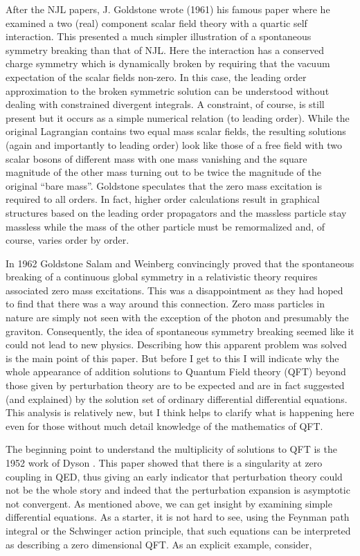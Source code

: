 \documentclass[letterpaper,twoside,preprintnumbers,slac_one]{revtex4}
\begin{document}
After the NJL papers, J. Goldstone wrote (1961) \cite{jg;1961} his
famous paper where he examined a two (real) component scalar field
theory with a quartic self interaction. This presented a much simpler
illustration of a spontaneous symmetry breaking than that of NJL.
Here the interaction has a conserved charge symmetry which is
dynamically broken by requiring that the vacuum expectation of the
scalar fields non-zero. In this case, the leading
order approximation to the broken symmetric solution can be understood
without dealing with constrained divergent integrals. A constraint, of
course, is still present but it occurs as a simple numerical relation
(to leading order). While the original Lagrangian contains two equal
mass scalar fields, the resulting solutions (again and importantly to
leading order) look like those of a free field with two scalar bosons
of different mass with one mass vanishing and the square magnitude of
the other mass turning out to be twice the magnitude of the original
``bare mass''. Goldstone speculates that the zero mass excitation is required to all orders.
In fact,  higher order calculations result in graphical
structures based on the leading order propagators and the massless
particle stay massless while the mass of the other particle must be
remormalized and, of course, varies order by order.

In 1962 Goldstone Salam and Weinberg \cite{gsw;1962} convincingly proved that the
spontaneous breaking of a continuous global symmetry in a relativistic
theory requires associated zero mass excitations. This was a disappointment as they had hoped to
find that there was a way around this connection. Zero mass particles in nature are simply not seen with the
exception of the photon and presumably the graviton. Consequently, the idea of spontaneous symmetry breaking
seemed like it could not lead to new physics. Describing how this apparent problem was solved is the main point of
this paper. But before I get to this I will indicate why the whole
appearance of addition solutions to Quantum Field theory (QFT) beyond those
given by perturbation theory are to be expected and are in fact
suggested (and explained) by the solution set of ordinary differential differential equations. This
analysis is relatively new, but I think helps to clarify what is happening here even for those without
much detail knowledge of the mathematics of QFT.

The beginning point to understand the multiplicity of solutions to QFT
is the 1952 work of Dyson \cite{dyson;1952}. This paper showed that
there is a singularity at zero coupling in QED, thus giving an early
indicator that perturbation theory could not be the whole story and
indeed that the perturbation expansion is asymptotic not
convergent. As mentioned above, we can get insight by examining simple
differential equations. As a starter, it is not hard to see, using the Feynman path
integral or the Schwinger action principle, that such equations can be
interpreted as describing a zero dimensional QFT. As an explicit example, consider,
\end{document}
